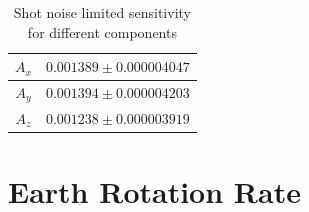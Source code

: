 \documentclass[a4paper]{article}
\begin{document}
\begin{table}
		\centering
\begin{tabular} {|c|c|}
 \hline
 $A_{x}$ & $0.001389 \pm 0.000004047$ \\
 \hline
 $A_{y}$  & $0.001394 \pm 0.000004203 $ \\
 \hline
 $A_{z}$ & $0.001238 \pm 0.000003919$ \\
 \hline
\end{tabular}
\caption{Shot noise limited sensitivity for different components}
\label{tab:A}
\end{table}

\section{Earth Rotation Rate}
\end{document}
